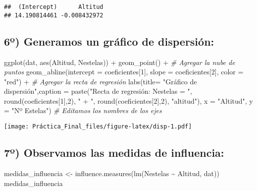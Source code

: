 \documentclass[
]{article}
\newenvironment{Shaded}{\begin{snugshade}}{\end{snugshade}}
\newcommand{\AttributeTok}[1]{\textcolor[rgb]{0.77,0.63,0.00}{#1}}
\newcommand{\CommentTok}[1]{\textcolor[rgb]{0.56,0.35,0.01}{\textit{#1}}}
\newcommand{\DecValTok}[1]{\textcolor[rgb]{0.00,0.00,0.81}{#1}}
\newcommand{\FunctionTok}[1]{\textcolor[rgb]{0.00,0.00,0.00}{#1}}
\newcommand{\NormalTok}[1]{#1}
\newcommand{\OtherTok}[1]{\textcolor[rgb]{0.56,0.35,0.01}{#1}}
\newcommand{\SpecialCharTok}[1]{\textcolor[rgb]{0.00,0.00,0.00}{#1}}
\newcommand{\StringTok}[1]{\textcolor[rgb]{0.31,0.60,0.02}{#1}}
\begin{document}
\begin{verbatim}
##  (Intercept)      Altitud 
## 14.190814461 -0.008432972
\end{verbatim}

\hypertarget{uxba-generamos-un-gruxe1fico-de-dispersiuxf3n}{%
\subsection{6º) Generamos un gráfico de
dispersión:}\label{uxba-generamos-un-gruxe1fico-de-dispersiuxf3n}}

\begin{Shaded}
\begin{Highlighting}[]
\FunctionTok{ggplot}\NormalTok{(dat, }\FunctionTok{aes}\NormalTok{(Altitud, Nestelas)) }\SpecialCharTok{+}
  \FunctionTok{geom\_point}\NormalTok{() }\SpecialCharTok{+}                   \CommentTok{\# Agregar la nube de puntos}
  \FunctionTok{geom\_abline}\NormalTok{(}\AttributeTok{intercept =}\NormalTok{ coeficientes[}\DecValTok{1}\NormalTok{], }\AttributeTok{slope =}\NormalTok{ coeficientes[}\DecValTok{2}\NormalTok{], }\AttributeTok{color =} \StringTok{"red"}\NormalTok{) }\SpecialCharTok{+} \CommentTok{\# Agregar la recta de regresión}
  \FunctionTok{labs}\NormalTok{(}\AttributeTok{title=} \StringTok{"Gráfico de dispersión"}\NormalTok{,}\AttributeTok{caption =} \FunctionTok{paste}\NormalTok{(}\StringTok{"Recta de regresión: Nestelas = "}\NormalTok{, }\FunctionTok{round}\NormalTok{(coeficientes[}\DecValTok{1}\NormalTok{],}\DecValTok{2}\NormalTok{), }\StringTok{" + "}\NormalTok{, }\FunctionTok{round}\NormalTok{(coeficientes[}\DecValTok{2}\NormalTok{],}\DecValTok{2}\NormalTok{), }\StringTok{"altitud"}\NormalTok{),}
       \AttributeTok{x =} \StringTok{"Altitud"}\NormalTok{, }\AttributeTok{y =} \StringTok{"Nº Estelas"}\NormalTok{) }\CommentTok{\# Editamos los nombres de los ejes}
\end{Highlighting}
\end{Shaded}

\texttt{[image: Práctica\_Final\_files/figure-latex/disp-1.pdf]}

\hypertarget{uxba-observamos-las-medidas-de-influencia}{%
\subsection{7º) Observamos las medidas de
influencia:}\label{uxba-observamos-las-medidas-de-influencia}}

\begin{Shaded}
\begin{Highlighting}[]
\NormalTok{medidas\_influencia }\OtherTok{\textless{}{-}} \FunctionTok{influence.measures}\NormalTok{(}\FunctionTok{lm}\NormalTok{(Nestelas }\SpecialCharTok{\textasciitilde{}}\NormalTok{ Altitud, dat))}
\NormalTok{medidas\_influencia}
\end{Highlighting}
\end{Shaded}
\end{document}
